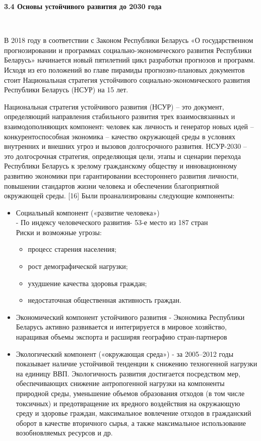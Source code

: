 \documentclass[14pt,a4paper]{article}
\begin{document}
    \begin{center}
        \textbf{3.4 Основы устойчивого развития до 2030 года}
    \end{center}
    \\
    \par
    В 2018 году в соответствии с Законом Республики Беларусь «О государственном прогнозировании и программах социально-экономического развития Республики Беларусь» начинается новый пятилетний цикл разработки прогнозов и программ. Исходя из его положений во
    главе пирамиды прогнозно-плановых документов стоит Национальная стратегия устойчивого
    социально-экономического развития Республики Беларусь (НСУР) на 15 лет.
    \par
    Национальная стратегия устойчивого развития (НСУР) – это документ, определяющий направления стабильного развития трех взаимосвязанных и взаимодополняющих компонент: человек как личность и генератор новых идей – конкурентоспособная экономика – качество окружающей среды в условиях внутренних и внешних угроз и вызовов долгосрочного развития.
    НСУР-2030 – это долгосрочная стратегия, определяющая цели, этапы и сценарии перехода Республики Беларусь к зрелому гражданскому обществу и инновационному развитию экономики при гарантировании всестороннего развития личности, повышении стандартов жизни человека и обеспечении благоприятной окружающей среды. [16]
    Были проанализированы следующие компоненты:
    \begin{itemize}
        \item Социальный компонент («развитие человека»)
        \\- По индексу человеческого развития- 53-е место из 187 стран
        \\Риски и возможные угрозы:
        \begin{itemize}
            \item процесс старения населения;
            \item рост демографической нагрузки;
            \item ухудшение качества здоровья граждан;
            \item недостаточная общественная активность граждан.
        \end{itemize}
        \item Экономический компонент устойчивого развития
        - Экономика Республики Беларусь активно развивается и интегрируется в мировое хозяйство, наращивая объемы экспорта и расширяя географию стран-партнеров
        \item Экологический компонент («окружающая среда»)
        - за 2005–2012 годы показывает наличие устойчивой тенденции к снижению техногенной нагрузки на единицу ВВП.
        Экологичность развития достигается посредством мер, обеспечивающих снижение антропогенной нагрузки на компоненты природной среды, уменьшение объемов образования отходов (в том числе токсичных) и предотвращение их вредного воздействия на окружающую среду и здоровье граждан, максимальное вовлечение отходов в гражданский оборот в качестве вторичного сырья, а также максимальное использование возобновляемых ресурсов и др.
    \end{itemize}
\end{document}
